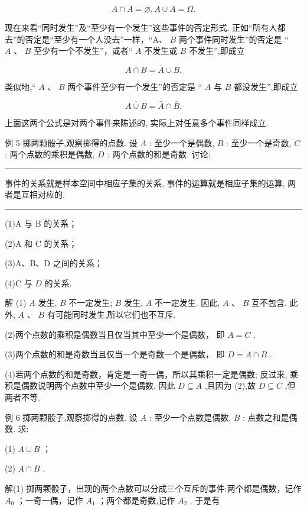 \documentclass[10pt]{article}
\newcommand{\HRule}{\begin{center}\rule{0.9\linewidth}{0.2mm}\end{center}}
\begin{document}
\[
A \cap  \overline{A} = \varnothing ,A \cup  \overline{A} = \Omega .
\]

现在来看“同时发生”及“至少有一个发生”这些事件的否定形式. 正如“所有人都去”的否定是“至少有一个人没去”一样，“A、 \(B\) 两个事件同时发生”的否定是 “ \(A\text{ 、 }B\) 至少有一个不发生”，或者“ \(A\) 不发生或 \(B\) 不发生”,即成立

\[
\overline{A \cap  B} = \bar{A} \cup  \bar{B}.
\]

类似地,“ \(A\text{ 、 }B\) 两个事件至少有一个发生”的否定是 “ \(A\) 与 \(B\) 都没发生”,即成立

\[
\overline{A \cup  B} = \bar{A} \cap  \bar{B}.
\]

上面这两个公式是对两个事件来陈述的, 实际上对任意多个事件同样成立.

例 5 掷两颗骰子,观察掷得的点数. 设 \(A\) : 至少一个是偶数, \(B\) : 至少一个是奇数, \(C\) : 两个点数的乘积是偶数, \(D\) : 两个点数的和是奇数. 讨论:



\HRule

事件的关系就是样本空间中相应子集的关系, 事件的运算就是相应子集的运算, 两者是互相对应的.

\HRule



(1)A 与 B 的关系；

(2)A 和 C 的关系；

(3)A、B、D 之间的关系；

(4)C 与 \(D\) 的关系.

解 (1) \(A\) 发生, \(B\) 不一定发生; \(B\) 发生, \(A\) 不一定发生. 因此, \(A\text{ 、 }B\) 互不包含. 此外, \(A\text{ 、 }B\) 有可能同时发生,所以它们也不互斥.

(2)两个点数的乘积是偶数当且仅当其中至少一个是偶数， 即 \(A = C\) .

(3)两个点数的和是奇数当且仅当一个是奇数一个是偶数， 即 \(D = A \cap  B\) .

(4)若两个点数的和是奇数，肯定是一奇一偶，所以其乘积一定是偶数; 反过来, 乘积是偶数说明两个点数中至少一个是偶数. 因此 \(D \subseteq  A\) ,且因为 (2),故 \(D \subseteq  C\) ,但两者不等.

例 6 掷两颗骰子,观察掷得的点数. 设 \(A\) : 至少一个点数是偶数, \(B\) : 点数之和是偶数. 求:

(1) \(A \cup  B\) ；

(2) \(A \cap  B\) .

解(1) 掷两颗骰子，出现的两个点数可以分成三个互斥的事件:两个都是偶数，记作 \({A}_{0}\) ；一奇一偶，记作 \({A}_{1}\) ；两个都是奇数,记作 \({A}_{2}\) . 于是有
\end{document}
